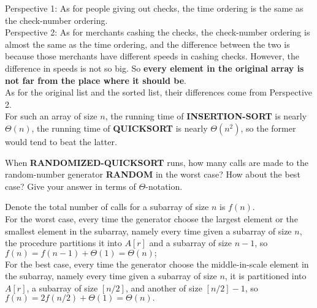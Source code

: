 \documentclass[12pt, a4paper, UTF8]{ctexart}
\begin{document}
\begin{solution}
  Perspective 1: As for people giving out checks, the time ordering is the same as the 
  check-number ordering.\\
  Perspective 2: As for merchants cashing the checks, the check-number ordering is almost 
  the same as the time ordering, and the difference between the two is 
  because those merchants have different speeds in cashing checks. 
  However, the difference in speeds is not so big. So 
  \textbf{every element in the original array is not far from the place where it should be}.\\
  As for the original list and the sorted list, their differences come 
  from Perspective 2.\\
  For such an array of size $n$, the running time of \textbf{INSERTION-SORT} 
  is nearly $\Theta(n)$, the running time of \textbf{QUICKSORT} is nearly 
  $\Theta(n^{2})$, so the former would tend to beat the latter.
\end{solution}
\begin{problem}[TC: 7.3-2]
  When \textbf{RANDOMIZED-QUICKSORT} runs, how many calls are made to 
  the random-number generator \textbf{RANDOM} in the worst case? How 
  about the best case? Give your answer in terms of $\Theta$-notation.
\end{problem}


\begin{solution}
  Denote the total number of calls for a subarray of size $n$ is $f(n)$.\\
  For the worst case, every time the generator choose the largest element 
  or the smallest element in the subarray, namely every time given a 
  subarray of size $n$, the procedure partitions it into $A[r]$ and a 
  subarray of size $n-1$, so\\
  $f(n) = f(n-1) + \Theta(1) = \Theta(n);$\\
  For the best case, every time the generator choose the middle-in-scale 
  element in the subarray, namely every time given a subarray of size $n$, 
  it is partitioned into $A[r]$, a subarray of size $[n/2]$, and another 
  of size $[n/2]-1$, so\\ 
  $f(n) = 2f(n/2) + \Theta(1) = \Theta(n).$
\end{solution}
\end{document}
